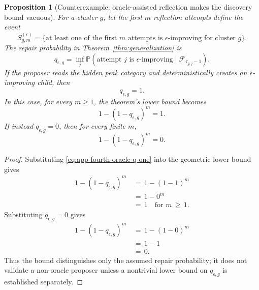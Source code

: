 \documentclass{article} %
\newtheorem{proposition}[theorem]{Proposition}
\begin{document}
\begin{proposition}[Counterexample: oracle-assisted reflection makes the discovery bound vacuous]
\label{prop:10}
For a cluster \(g\), let the first \(m\) reflection attempts define the event
\begin{equation}
\label{eq:app-fourth-oracle-event}
S_{g,m}^{(\epsilon)}
=
\{\text{at least one of the first }m\text{ attempts is }\epsilon\text{-improving for cluster }g\}.
\end{equation}
The repair probability in Theorem~\ref{thm:generalization} is
\begin{equation}
\label{eq:app-fourth-oracle-q}
q_{\epsilon,g}
=
\inf_j
\mathbb{P}
\!\left(
\text{attempt }j\text{ is }\epsilon\text{-improving}
\mid
\mathcal{F}_{\tau_{g,j}-1}
\right).
\end{equation}
If the proposer reads the hidden peak category and deterministically creates an \(\epsilon\)-improving child, then
\begin{equation}
\label{eq:app-fourth-oracle-q-one}
q_{\epsilon,g}=1.
\end{equation}
In this case, for every \(m\ge 1\), the theorem's lower bound becomes
\begin{equation}
\label{eq:app-fourth-oracle-bound-one}
1-(1-q_{\epsilon,g})^m
=
1.
\end{equation}
If instead \(q_{\epsilon,g}=0\), then for every finite \(m\),
\begin{equation}
\label{eq:app-fourth-oracle-bound-zero}
1-(1-q_{\epsilon,g})^m
=
0.
\end{equation}
\end{proposition}

\begin{proof}
Substituting \eqref{eq:app-fourth-oracle-q-one} into the geometric lower bound gives
\begin{align}
\label{eq:app-fourth-oracle-proof-one}
1-(1-q_{\epsilon,g})^m
&\,=\,
1-(1-1)^m
\\
&\,=\,
1-0^m
\\
&\,=\,
1
\quad
\text{for }m\,\ge\, 1.
\end{align}
Substituting \(q_{\epsilon,g}=0\) gives
\begin{align}
\label{eq:app-fourth-oracle-proof-zero}
1-(1-q_{\epsilon,g})^m
&\,=\,
1-(1-0)^m
\\
&\,=\,
1-1
\\
&\,=\,
0.
\end{align}
Thus the bound distinguishes only the assumed repair probability; it does not validate a non-oracle proposer unless a nontrivial lower bound on \(q_{\epsilon,g}\) is established separately.
\end{proof}
\end{document}
